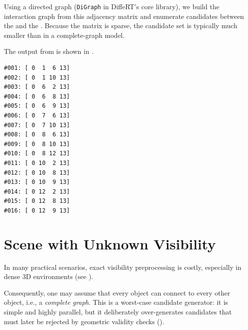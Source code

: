 Using a directed graph (\texttt{DiGraph} in DiffeRT's core library), we build the interaction graph from this adjacency matrix and enumerate candidates between the  and the . Because the matrix is sparse, the candidate set is typically much smaller than in a complete-graph model.

\begin{listing*}[htpb]
  \caption{Constructing a directed graph from a known visibility matrix.}
\end{listing*}

\begin{listing}[htpb]
  \caption{Enumerating known-visibility path candidates with \texttt{DiGraph}.}
\end{listing}

The output from  is shown in .
\begin{listing}[htpb]
  \caption{Output from .}
\begin{verbatim}
#001: [ 0  1  6 13]
#002: [ 0  1 10 13]
#003: [ 0  6  2 13]
#004: [ 0  6  8 13]
#005: [ 0  6  9 13]
#006: [ 0  7  6 13]
#007: [ 0  7 10 13]
#008: [ 0  8  6 13]
#009: [ 0  8 10 13]
#010: [ 0  8 12 13]
#011: [ 0 10  2 13]
#012: [ 0 10  8 13]
#013: [ 0 10  9 13]
#014: [ 0 12  2 13]
#015: [ 0 12  8 13]
#016: [ 0 12  9 13]
\end{verbatim}
\end{listing}

\section{Scene with Unknown Visibility}

In many practical scenarios, exact visibility preprocessing is costly, especially in dense 3D environments (see ).

Consequently, one may assume that every object can connect to every other object, i.e., a \emph{complete graph}. This is a worst-case candidate generator: it is simple and highly parallel, but it deliberately over-generates candidates that must later be rejected by geometric validity checks ().

